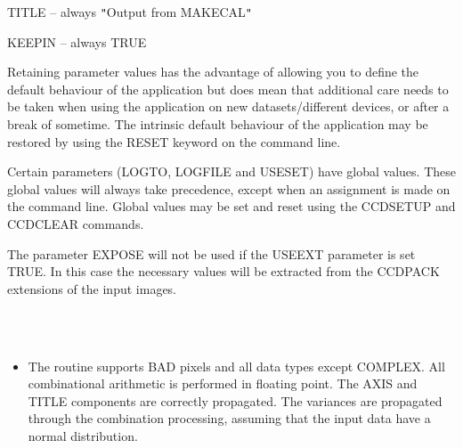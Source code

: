 \documentclass[twoside,11pt]{article}
\newcommand{\htmlref}[2]{#1}
\renewcommand{\_}{\texttt{\symbol{95}}}
\newcommand{\qt}[1]{{\tt "}#1{\tt "}}
\newcommand{\xroutine}[1]{\htmlref{{\sc #1}}{#1}}
\newcommand{\sstimplementationstatus}[1]{
   \item[{Implementation Status:}] \mbox{} \\[1.3ex] #1}
\newcommand{\sstitemlist}[1]{
  \mbox{} \\
  \vspace{-3.5ex}
  \begin{itemize}
     #1
  \end{itemize}
}
\newcommand{\sstitem}{\item}
\newcommand{\sstimplementationstatus}[1]{
      \item[Implementation Status:] #1
   }
\newcommand{\sstitemlist}[1]{
      \begin{itemize}
         #1
      \end{itemize}
      \\
   }
\newcommand{\sstitem}{\item}
\begin{document}
{{{         \sstitem
            TITLE  -- always \qt{Output from MAKECAL}

         \sstitem
            KEEPIN -- always TRUE

      }
      Retaining parameter values has the advantage of allowing you to
      define the default behaviour of the application but does mean
      that additional care needs to be taken when using the application
      on new datasets/different devices, or after a break of sometime.
      The intrinsic default behaviour of the application may be
      restored by using the RESET keyword on the command line.

      Certain parameters (LOGTO, LOGFILE and USESET) have global values. These
      global values will always take precedence, except when an
      assignment is made on the command line.  Global values may be set
      and reset using the \xroutine{CCDSETUP} and \xroutine{CCDCLEAR} commands.

      The parameter EXPOSE will not be used if the USEEXT parameter is
      set TRUE. In this case the necessary values will be extracted from
      the CCDPACK extensions of the input images.
   }
   \sstimplementationstatus{
      \sstitemlist{

         \sstitem
         The routine supports BAD pixels and all data types except
           COMPLEX. All combinational arithmetic is performed in floating
           point. The AXIS and TITLE components are correctly
           propagated. The variances are propagated through the combination
           processing, assuming that the input data have a normal
           distribution.
      }
   }
}
\end{document}
